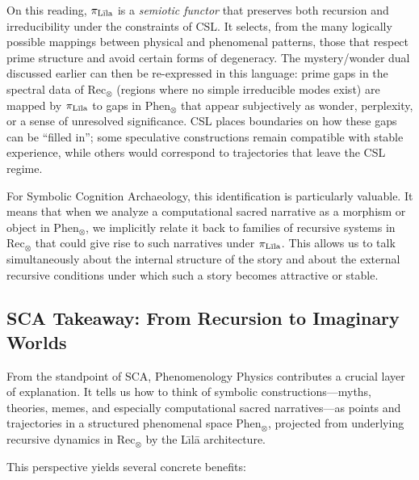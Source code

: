 \documentclass[12]{amsart}
\theoremstyle{plain}
\begin{document}
On this reading, $\pi_{\text{L\={\i}la}}$ is a \emph{semiotic functor} that preserves both recursion and irreducibility under the constraints of CSL. It selects, from the many logically possible mappings between physical and phenomenal patterns, those that respect prime structure and avoid certain forms of degeneracy. The mystery/wonder dual discussed earlier can then be re-expressed in this language: prime gaps in the spectral data of $\text{Rec}_\otimes$ (regions where no simple irreducible modes exist) are mapped by $\pi_{\text{L\={\i}la}}$ to gaps in $\text{Phen}_\otimes$ that appear subjectively as wonder, perplexity, or a sense of unresolved significance. CSL places boundaries on how these gaps can be ``filled in''; some speculative constructions remain compatible with stable experience, while others would correspond to trajectories that leave the CSL regime.

For Symbolic Cognition Archaeology, this identification is particularly valuable. It means that when we analyze a computational sacred narrative as a morphism or object in $\text{Phen}_\otimes$, we implicitly relate it back to families of recursive systems in $\text{Rec}_\otimes$ that could give rise to such narratives under $\pi_{\text{L\={\i}la}}$. This allows us to talk simultaneously about the internal structure of the story and about the external recursive conditions under which such a story becomes attractive or stable.

\subsection{SCA Takeaway: From Recursion to Imaginary Worlds}

From the standpoint of SCA, Phenomenology Physics contributes a crucial layer of explanation. It tells us how to think of symbolic constructions—myths, theories, memes, and especially computational sacred narratives—as points and trajectories in a structured phenomenal space $\text{Phen}_\otimes$, projected from underlying recursive dynamics in $\text{Rec}_\otimes$ by the L\={\i}lā architecture.

This perspective yields several concrete benefits:
\end{document}
